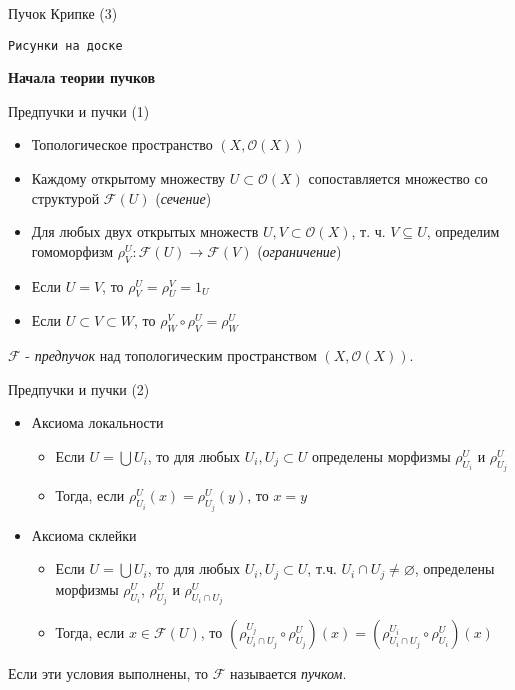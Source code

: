 \documentclass{beamer}
\begin{document}
\begin{frame}{Пучок Крипке (3)}
\begin{center}
	\texttt{Рисунки на доске}
\end{center}
\end{frame}

\begin{frame}{}
\begin{center}
	\textbf{Начала теории пучков}
\end{center}
\end{frame}

\begin{frame}{Предпучки и пучки (1)}
\begin{itemize}
	\item Топологическое пространство $(X, \mathcal{O}(X))$
	\item Каждому открытому множеству $U \subset \mathcal{O}(X)$ сопоставляется множество со структурой $\mathcal{F}(U)$ (\textit{сечение})
	\item Для любых двух открытых множеств $U, V \subset \mathcal{O}(X)$, т. ч. $V \subseteq U$, определим гомоморфизм $\rho^U_V : \mathcal{F}(U) \to \mathcal{F}(V)$ (\textit{ограничение})
	\item Если $U = V$, то $\rho^U_V = \rho^V_U = 1_U$
	\item Если $U \subset V \subset W$, то $\rho^V_W \circ \rho^U_V = \rho^U_W$
\end{itemize}
\bigskip
$\mathcal{F}$ - \textit{предпучок} над топологическим пространством $(X, \mathcal{O}(X))$.
\end{frame}

\begin{frame}{Предпучки и пучки (2)}
\begin{itemize}
	\item Аксиома локальности
		\medskip
		\begin{itemize}
			\item Если $U = \bigcup U_i$, то для любых $U_i, U_j \subset U$ определены морфизмы $\rho^U_{U_i}$ и $\rho^U_{U_j}$
			\medskip
			\item Тогда, если $\rho^U_{U_i}(x) = \rho^U_{U_j}(y)$, то $x = y$
		\end{itemize}
	\bigskip
	\item Аксиома склейки
		\medskip
		\begin{itemize}
			\item Если $U = \bigcup U_i$, то для любых $U_i, U_j \subset U$, т.ч. $U_i \cap U_j \neq \varnothing$, определены морфизмы $\rho^U_{U_i}$, $\rho^U_{U_j}$ и $\rho^U_{U_i \cap U_j}$
			\medskip
			\item Тогда, если $x \in \mathcal{F}(U)$, то $(\rho^{U_j}_{U_i \cap U_j} \circ \rho^U_{U_j})(x) = (\rho^{U_i}_{U_i \cap U_j} \circ \rho^U_{U_i})(x)$
		\end{itemize}
\end{itemize}
\bigskip
Если эти условия выполнены, то $\mathcal{F}$ называется \textit{пучком}.
\end{frame}
\end{document}
